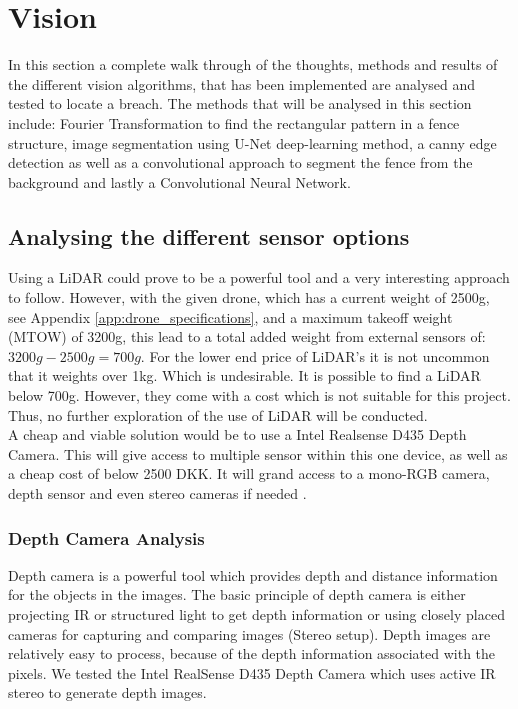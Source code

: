 \documentclass[../Head/Main.tex]{subfiles}
\begin{document}
\section{Vision}
\label{sec:vision}
In this section a complete walk through of the thoughts, methods and results of the different vision algorithms, that has been implemented are analysed and tested to locate a breach. The methods that will be analysed in this section include: Fourier Transformation to find the rectangular pattern in a fence structure, image segmentation using U-Net deep-learning method, a canny edge detection as well as a convolutional approach to segment the fence from the background and lastly a Convolutional Neural Network.    

\subsection{Analysing the different sensor options}
\label{subsec:analyse_the_approches}

Using a LiDAR could prove to be a powerful tool and a very interesting approach to follow. However, with the given drone, which has a current weight of 2500g, see Appendix \ref{app:drone_specifications}, and a maximum takeoff weight (MTOW) of 3200g, this lead to a total added weight from external sensors of: $3200g - 2500g = 700g$. For the lower end price of LiDAR's it is not uncommon that it weights over 1kg. Which is undesirable. It is possible to find a LiDAR below 700g. However, they come with a cost which is not suitable for this project. Thus, no further exploration of the use of LiDAR will be conducted. \\
A cheap and viable solution would be to use a Intel Realsense D435 Depth Camera. This will give access to multiple sensor within this one device, as well as a cheap cost of below 2500 DKK. It will grand access to a mono-RGB camera, depth sensor and even stereo cameras if needed \cite{Intel_RS_price}.

\subsubsection{Depth Camera Analysis}
\label{subsubsec:depth_camera_analysis}
Depth camera is a powerful tool which provides depth and distance information for the objects in the images. The basic principle of depth camera is either projecting IR or structured light to get depth information or using closely placed cameras for capturing and comparing images (Stereo setup). Depth images are relatively easy to process, because of the depth information associated with the pixels. We tested the Intel RealSense D435 Depth Camera which uses active IR stereo to generate depth images.
\end{document}
